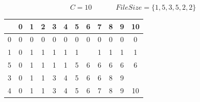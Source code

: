 \documentclass[12pt, letterpaper]{article}
\begin{document}
$$ C=10\;\;\;\;\;\;\;\;\;\;\;\;FileSize=\{1,5,3,5,2,2\}$$\begin{center}
    \begin{tabular}{c|ccccccccccc}
                                  & 0 & 1                         & 2                         & 3                         & 4                         & 5                         & 6                                                & 7                         & 8                         & 9                         & 10                                               \\ \hline
        0                         & 0 & 0                         & 0                         & 0                         & 0                         & 0                         & 0                                                & 0                         & 0                         & 0                         & 0                                                \\
        \cellcolor[HTML]{CBCEFB}1 & 0 & \cellcolor[HTML]{FFCCC9}1 & \cellcolor[HTML]{C0C0C0}1 & \cellcolor[HTML]{C0C0C0}1 & \cellcolor[HTML]{C0C0C0}1 & \cellcolor[HTML]{C0C0C0}1 & \cellcolor[HTML]{FE0000}{\color[HTML]{FFFFFF} 1} & 1                         & 1                         & 1                         & 1                                                \\
        \cellcolor[HTML]{CBCEFB}5 & 0 & 1                         & 1                         & 1                         & 1                         & 5                         & \cellcolor[HTML]{9AFF99}6                        & 6                         & 6                         & 6                         & 6                                                \\
        3                         & 0 & 1                         & 1                         & 3                         & 4                         & 5                         & \cellcolor[HTML]{FFCCC9}6                        & \cellcolor[HTML]{C0C0C0}6 & \cellcolor[HTML]{C0C0C0}8 & \cellcolor[HTML]{C0C0C0}9 & \cellcolor[HTML]{FE0000}{\color[HTML]{FFFFFF} 9} \\
        \cellcolor[HTML]{CBCEFB}4 & 0 & 1                         & 1                         & 3                         & 4                         & 5                         & 6                                                & 7                         & 8                         & 9                         & \cellcolor[HTML]{9AFF99}10                       \\

\end{tabular}
\end{center}
\end{document}
